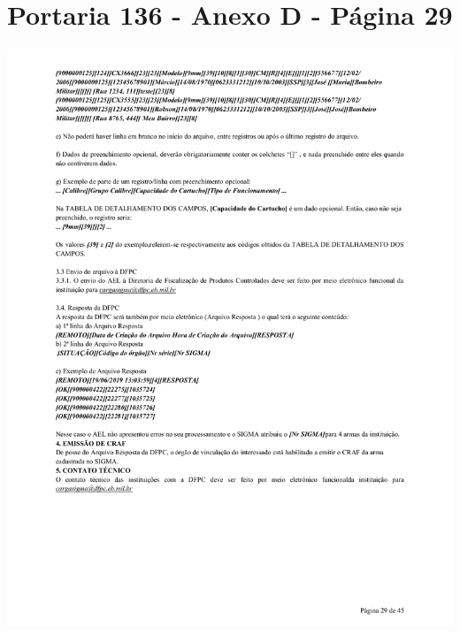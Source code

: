 \chapter{Portaria 136 - Anexo D - Página 29}
\includegraphics[scale=0.7]{imagens/AnexoA4-AnexoD-portaria-136}

